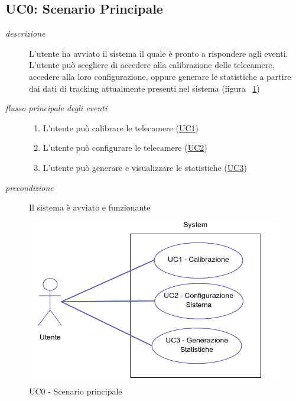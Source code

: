 \subsection{UC0: Scenario Principale} \label{sec:uc0}
\begin{description}
 \item[\em{descrizione}] L'utente ha avviato il sistema il quale è pronto a rispondere agli eventi. L'utente può scegliere di accedere alla calibrazione delle telecamere, accedere alla loro configurazione, oppure generare le statistiche a partire dai dati di tracking attualmente presenti nel sistema (figura ~\ref{fig:uc0})
 
\item[\em{flusso principale degli eventi}] \mbox{}
 \begin{enumerate}
	\item L'utente può calibrare le telecamere (\hyperref[sec:uc1]{UC1}) 
	\item L'utente può configurare le telecamere (\hyperref[sec:uc2]{UC2})
	\item L'utente può generare e visualizzare le statistiche (\hyperref[sec:uc3]{UC3})
\end{enumerate} 
 \item[\em{precondizione}] Il sistema è avviato e funzionante \end{description}
\begin{figure}[htpb]
\centering
\includegraphics[scale=0.4]{./images/uc0.png}
\caption{UC0 - Scenario principale}
\label{fig:uc0}
\end{figure} 
 


